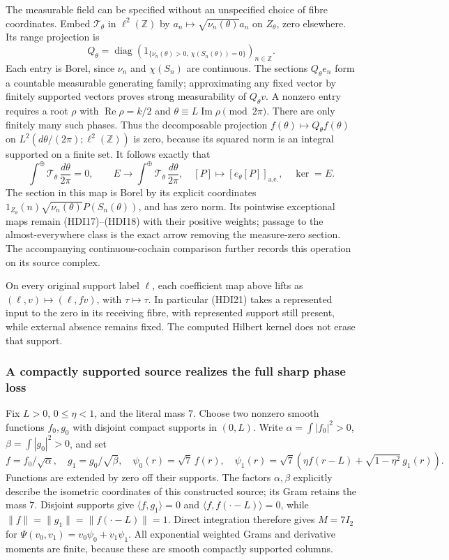 The measurable field can be specified without an unspecified
choice of fibre coordinates. Embed \(\mathcal T_\theta\) in
\(\ell^2(\mathbb Z)\) by \(a_n\mapsto\sqrt{\nu_n(\theta)}a_n\)
on \(Z_\theta\), zero elsewhere. Its range projection is
\[
 Q_\theta=\operatorname{diag}\!
 \left(1_{\{\nu_n(\theta)>0,\ \chi(S_n(\theta))=0\}}\right)_{n\in\mathbb Z}.
 \tag{HDI20}
\]
Each entry is Borel, since \(\nu_n\) and \(\chi(S_n)\) are
continuous. The sections \(Q_\theta e_n\) form a countable
measurable generating family; approximating any fixed vector
by finitely supported vectors proves strong measurability of
\(Q_\theta v\). A nonzero entry requires a root \(\rho\) with
\(\operatorname{Re}\rho=k/2\) and
\(\theta\equiv L\operatorname{Im}\rho\pmod{2\pi}\).
There are only finitely many such phases. Thus the decomposable
projection \(f(\theta)\mapsto Q_\theta f(\theta)\) on
\(L^2(d\theta/(2\pi);\ell^2(\mathbb Z))\) is zero, because its
squared norm is an integral supported on a finite set.
It follows exactly that
\[
 \int^\oplus\mathcal T_\theta\,\frac{d\theta}{2\pi}=0,\qquad
 E\longrightarrow\int^\oplus\mathcal T_\theta\,\frac{d\theta}{2\pi},
 \quad[P]\mapsto[e_\theta[P]]_{\mathrm{a.e.}},
 \quad\ker=E.
 \tag{HDI21}
\]
The section in this map is Borel by its explicit coordinates
\(1_{Z_\theta}(n)\sqrt{\nu_n(\theta)}P(S_n(\theta))\), and has
zero norm. Its pointwise exceptional maps remain (HDI17)--(HDI18)
with their positive weights; passage to the almost-everywhere
class is the exact arrow removing the measure-zero section.
The accompanying continuous-cochain comparison further records
this operation on its source complex.

On every original support label \(\ell\), each coefficient map
above lifts as \((\ell,v)\mapsto(\ell,fv)\), with
\(\tau\mapsto\tau\). In particular (HDI21) takes a represented
input to the zero in its receiving fibre, with represented
support still present, while external absence remains fixed.
The computed Hilbert kernel does not erase that support.

\subsubsection{A compactly supported source realizes the full sharp phase loss}
Fix \(L>0\), \(0\le\eta<1\), and the literal mass \(7\).
Choose two nonzero smooth functions \(f_0,g_0\) with disjoint
compact supports in \((0,L)\). Write
\(\alpha=\int|f_0|^2>0\), \(\beta=\int|g_0|^2>0\), and set
\[
 f=f_0/\sqrt\alpha,\quad g_1=g_0/\sqrt\beta,\quad
 \psi_0(r)=\sqrt7\,f(r),\quad
 \psi_1(r)=\sqrt7\left(\eta f(r-L)+\sqrt{1-\eta^2}\,g_1(r)\right).
 \tag{HDI22}
\]
Functions are extended by zero off their supports. The factors
\(\alpha,\beta\) explicitly describe the isometric coordinates
of this constructed source; its Gram retains the mass \(7\).
Disjoint supports give \(\langle f,g_1\rangle=0\) and
\(\langle f,f(\cdot-L)\rangle=0\), while
\(\|f\|=\|g_1\|=\|f(\cdot-L)\|=1\).
Direct integration therefore gives \(M=7I_2\) for
\(\Psi(v_0,v_1)=v_0\psi_0+v_1\psi_1\).
All exponential weighted Grams and derivative moments are
finite, because these are smooth compactly supported columns.


